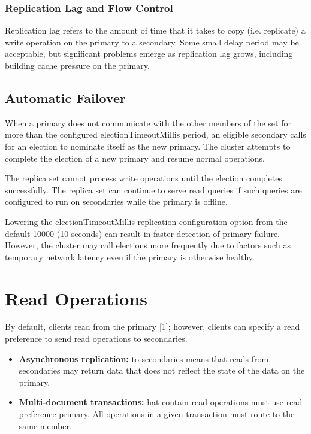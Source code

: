 \subsubsection{Replication Lag and Flow Control}
Replication lag refers to the amount of time that it takes to copy (i.e. replicate) a write operation on the primary to a secondary. Some small delay period may be acceptable, but significant problems emerge as replication lag grows, including building cache pressure on the primary.

\subsection{Automatic Failover}
When a primary does not communicate with the other members of the set for more than the configured electionTimeoutMillis period, an eligible secondary calls for an election to nominate itself as the new primary. The cluster attempts to complete the election of a new primary and resume normal operations.

The replica set cannot process write operations until the election completes successfully. The replica set can continue to serve read queries if such queries are configured to run on secondaries while the primary is offline.

Lowering the electionTimeoutMillis replication configuration option from the default 10000 (10 seconds) can result in faster detection of primary failure. However, the cluster may call elections more frequently due to factors such as temporary network latency even if the primary is otherwise healthy.

\section{Read Operations}
By default, clients read from the primary [1]; however, clients can specify a read preference to send read operations to secondaries.
\begin{itemize}
    \item \textbf{Asynchronous replication:} to secondaries means that reads from secondaries may return data that does not reflect the state of the data on the primary.
    \item \textbf{Multi-document transactions:} hat contain read operations must use read preference primary. All operations in a given transaction must route to the same member.
\end{itemize}

